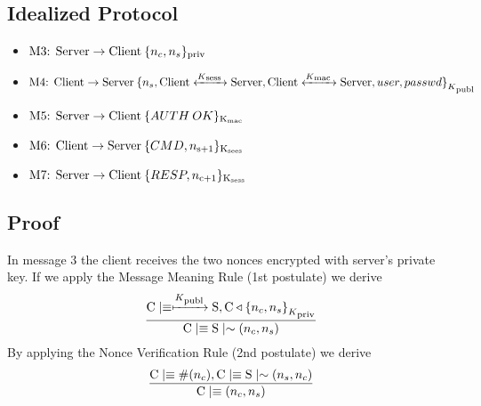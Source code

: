 \subsection{Idealized Protocol}
\begin{itemize}
\item \(\textnormal{M3: Server} \rightarrow \textnormal{Client} \: \lbrace n_c,n_s \rbrace \textsubscript{priv}\)
\item \(\textnormal{M4: Client} \rightarrow \textnormal{Server} \: { \{ n_s,\textnormal{Client} \xleftrightarrow{K\textsubscript{sess }} \textnormal{Server},\textnormal{Client} \xleftrightarrow{K\textsubscript{mac }} \textnormal{Server},user,passwd \} }_{K\textsubscript{publ}}\)
\item \(\textnormal{M5: Server} \rightarrow \textnormal{Client} \: \lbrace AUTH\:OK \rbrace \textsubscript{K\textsubscript{mac}}\)
\item \(\textnormal{M6: Client} \rightarrow \textnormal{Server} \: \lbrace CMD,n\textsubscript{s+1} \rbrace \textsubscript{K\textsubscript{sees}}\)
\item \(\textnormal{M7: Server} \rightarrow \textnormal{Client} \: \lbrace RESP,n\textsubscript{c+1} \rbrace \textsubscript{K\textsubscript{sess}}\)
\end{itemize}

\subsection{Proof}
In message 3 the client receives the two nonces encrypted with server's private key. If we apply the Message Meaning Rule (1st postulate) we derive
\[ \frac{\textnormal{C} \mid\equiv \xmapsto{K\textsubscript{publ}} \textnormal{S}, \textnormal{C} \triangleleft { \{ n_c,n_s \} }_{K\textsubscript{priv}}}
        {\textnormal{C} \mid\equiv \textnormal{S} \mid\sim (n_c,n_s)}\]
By applying the Nonce Verification Rule (2nd postulate) we derive
\[ \frac{\textnormal{C} \mid\equiv \#(n_c), \textnormal{C} \mid\equiv \textnormal{S} \mid\sim (n_s,n_c)}{\textnormal{C} \mid\equiv (n_c,n_s)}\]

